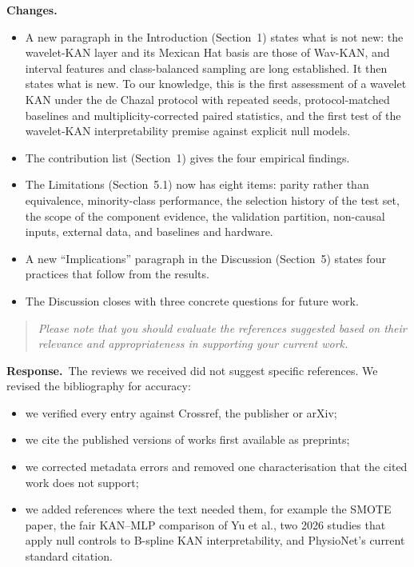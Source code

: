 \documentclass[11pt]{article}
\newenvironment{reviewer}{\begin{quote}\itshape\color{revcol}}{\end{quote}}
\newcommand{\resp}{\textbf{Response.}~}
\newcommand{\chg}{\textbf{Changes.}~}
\begin{document}
\chg
\begin{itemize}[leftmargin=1.2em,itemsep=2pt]
\item A new paragraph in the Introduction (Section~1) states what is not new: the wavelet-KAN layer and its Mexican Hat basis are those of Wav-KAN, and interval features and class-balanced sampling are long established. It then states what is new. To our knowledge, this is the first assessment of a wavelet KAN under the de Chazal protocol with repeated seeds, protocol-matched baselines and multiplicity-corrected paired statistics, and the first test of the wavelet-KAN interpretability premise against explicit null models.
\item The contribution list (Section~1) gives the four empirical findings.
\item The Limitations (Section~5.1) now has eight items: parity rather than equivalence, minority-class performance, the selection history of the test set, the scope of the component evidence, the validation partition, non-causal inputs, external data, and baselines and hardware.
\item A new ``Implications'' paragraph in the Discussion (Section~5) states four practices that follow from the results.
\item The Discussion closes with three concrete questions for future work.
\end{itemize}

\begin{reviewer}
Please note that you should evaluate the references suggested based on their relevance and appropriateness in supporting your current work.
\end{reviewer}
\resp The reviews we received did not suggest specific references. We revised the bibliography for accuracy:
\begin{itemize}[leftmargin=1.2em,itemsep=2pt]
\item we verified every entry against Crossref, the publisher or arXiv;
\item we cite the published versions of works first available as preprints;
\item we corrected metadata errors and removed one characterisation that the cited work does not support;
\item we added references where the text needed them, for example the SMOTE paper, the fair KAN--MLP comparison of Yu et al., two 2026 studies that apply null controls to B-spline KAN interpretability, and PhysioNet's current standard citation.
\end{itemize}
\end{document}
